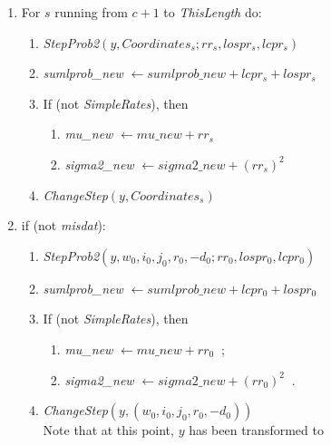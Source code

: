 \documentclass[a4paper,12pt,fleqn]{article}
\newcommand{\remark}[1]{{\textcolor[named]{Red}{#1}}}
\begin{document}
\begin{enumerate}[resume]
\begin{enumerate}
\begin{enumerate}
        \item \textit{sigma2\_new} $ \leftarrow
              \textit{sigma2\_new}  + (rr_s)^2  $ \ ;
        \end{enumerate}
      \item\textit{ChangeStep}$(y,
         \textit{Coordinates}_{\textit{perm}(s)})$ \ .
      \end{enumerate}
\item %
      For $s$ running from $c+1$ to \textit{ThisLength} do:
      \begin{enumerate}
      \item \textit{StepProb2}$(y, \textit{Coordinates}_{s}; rr_s, lospr_s, lcpr_s)$
      \item \textit{sumlprob\_new} $ \leftarrow \textit{sumlprob\_new} + lcpr_s + lospr_s $
      \item If (not \textit{SimpleRates}), then
        \begin{enumerate}
        \item \textit{mu\_new} $ \leftarrow  \textit{mu\_new} + rr_s $
        \item \textit{sigma2\_new} $ \leftarrow \textit{sigma2\_new}  + (rr_s)^2  $
        \end{enumerate}
      \item \textit{ChangeStep}$(y, \textit{Coordinates}_{s})$
      \end{enumerate}
\item if (not \textit{misdat}):
      \begin{enumerate}
      \item \textit{StepProb2}$(y,w_0,i_0,j_0,r_0,-d_0; rr_0, lospr_0, lcpr_0)$
      \item \textit{sumlprob\_new} $ \leftarrow \textit{sumlprob\_new} + lcpr_0 + lospr_0 $
      \item If (not \textit{SimpleRates}), then
         \begin{enumerate}
         \item  \textit{mu\_new} $ \leftarrow \textit{mu\_new} + rr_0 \ $ ;
         \item \textit{sigma2\_new} $ \leftarrow \textit{sigma2\_new}  + (rr_0)^2 \ $ .
         \end{enumerate}
      \item \textit{ChangeStep}$(y, (w_0,i_0,j_0,r_0,-d_0))$ \\
            Note that at this point, $y$ has been transformed to

\end{enumerate}
\end{enumerate}
\end{document}
